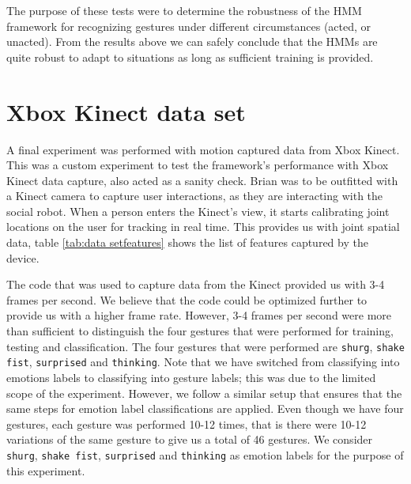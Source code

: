 \documentclass[]{report}   %
\begin{document}
The purpose of these tests were to determine the robustness of the HMM framework for recognizing gestures under different circumstances (acted, or unacted). From the results above we can safely conclude that the HMMs are quite robust to adapt to situations as long as sufficient training is provided.

\section{Xbox Kinect data set}
A final experiment was performed with motion captured data from Xbox Kinect. This was a custom experiment to test the framework's performance with Xbox Kinect data capture, also acted as a sanity check. Brian was to be outfitted with a Kinect camera to capture user interactions, as they are interacting with the social robot. When a person enters the Kinect's view, it starts calibrating joint locations on the user for tracking in real time. This provides us with joint spatial data, table \ref{tab:data setfeatures} shows the list of features captured by the device.

The code that was used to capture data from the Kinect provided us with 3-4 frames per second. We believe that the code could be optimized further to provide us with a higher frame rate. However, 3-4 frames per second were more than sufficient to distinguish the four gestures that were performed for training, testing and classification. The four gestures that were performed are \texttt{shurg}, \texttt{shake fist}, \texttt{surprised} and \texttt{thinking}. Note that we have switched from classifying into emotions labels to classifying into gesture labels; this was due to the limited scope of the experiment. However, we follow a similar setup that ensures that the same steps for emotion label classifications are applied. Even though we have four gestures, each gesture was performed 10-12 times, that is there were 10-12 variations of the same gesture to give us a total of 46 gestures. We consider \texttt{shurg}, \texttt{shake fist}, \texttt{surprised} and \texttt{thinking} as emotion labels for the purpose of this experiment. 
\end{document}
